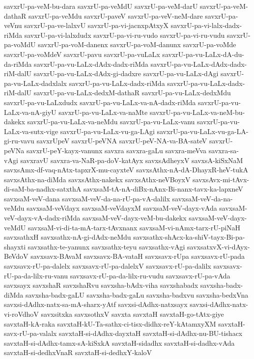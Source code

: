 {savxrU-pa-veM-bu-dara
savxrU-pa-veMdU
savxrU-pa-veM-darU
savxrU-pa-veM-dathaR
savxrU-pa-veMdu
savxrU-paveV
savxrU-pa-veV-neM-dare
savxrU-pa-veVnu
savxrU-pa-ve-lalxvU
savxrU-pa-vi-jacnxpAtxyX
savxrU-pa-vi-lalx-dadx-riMda
savxrU-pa-vi-lalxdudx
savxrU-pa-vi-ru-vudo
savxrU-pa-vi-ru-vudu
savxrU-pa-voMdU
savxrU-pa-voM-danenx
savxrU-pa-voM-danunx
savxrU-pa-voMde
savxrU-pa-voMdeV
savxrU-pavu
savxrU-pa-vuLaLx
savxrU-pa-vu-LaLx-dA-du-da-riMda
savxrU-pa-vu-LaLx-dAdx-dadx-riMda
savxrU-pa-vu-LaLx-dAdx-dadx-riM-dalU
savxrU-pa-vu-LaLx-dAdx-gi-dadxre
savxrU-pa-vu-LaLx-dAgi
savxrU-pa-vu-LaLx-dadxlalx
savxrU-pa-vu-LaLx-dadx-riMda
savxrU-pa-vu-LaLx-dadx-riM-dalU
savxrU-pa-vu-LaLx-dedxM-dathaR
savxrU-pa-vu-LaLx-dedxMdu
savxrU-pa-vu-LaLxdudx
savxrU-pa-vu-LaLx-va-nA-dadx-riMda
savxrU-pa-vu-LaLx-va-nA-giyU
savxrU-pa-vu-LaLx-va-naMte
savxrU-pa-vu-LaLx-va-neM-bu-dakekx
savxrU-pa-vu-LaLx-va-neMdu
savxrU-pa-vu-LaLx-vanu
savxrU-pa-vu-LaLx-va-sutx-vige
savxrU-pa-vu-LaLx-vu-ga-LAgi
savxrU-pa-vu-LaLx-vu-ga-LA-gi-ru-vavu
savxrUpeV
savxrU-peVNA
savxrU-peV-NA-va-BA-sateV
savxrU-peVNa
savxrU-peY-kayx-vanunx
savxra
savxra-gaLu
savxra-meVva
savxra-sa-vAgi
savxravU
savxra-va-NaR-pa-doV-katAyx
savxsAdheyxV
savxsA-kiSxNaM
savxsAmx-df-vaq-nAtx-tapxrX-mu-cayxteV
savxsAthx-nA-dA-DhayxR-heV-tukA
savxsAthx-na-diMda
savxsAthx-nakekx
savxsAthx-neVBoyxV
savxsAvx-mi-tAvx-di-saM-ba-nadhx-satxthA
savxsaM-tA-nA-diBx-nAnx-Bi-nanx-tavx-ka-lapxneV
savxsaM-veV-dana
savxsaM-veV-da-na-rU-pa-vA-dalilx
savxsaM-veV-da-na-veMdu
savxsaM-veVdayx
savxsaM-veVdayxM
savxsaM-veV-dayx-vAda
savxsaM-veV-dayx-vA-dadx-riMda
savxsaM-veV-dayx-veM-bu-dakekx
savxsaM-veV-dayx-veMdU
savxsaM-vi-di-ta-mA-tarx-tAvxnanx
savxsaM-vi-nAmx-tarx-rU-piNaH
savxsathxH
savxsathx-nA-gi-dAdx-neMdu
savxsathx-shAcx-ka-shiV-tayx-Bi-pa-shayxti
savxsathx-te-yanunx
savxsathx-teyu
savxsathx-vAgi
savxsatxvX-vi-dAyx-BeVdoV
savxsavx-BAvaM
savxsavx-BA-vataH
savxsavx-rUpa
savxsavx-rU-pada
savxsavx-rU-pa-dalelx
savxsavx-rU-pa-dalelxV
savxsavx-rU-pa-dalilx
savxsavx-rU-pa-da-lilx-ru-vanu
savxsavx-rU-pa-da-lilx-ru-vudu
savxsavx-rU-pa-vAda
savxsayx
savxshaR
savxshaRvu
savxsha-bAdx-viha
savxshabadx
savxsha-badx-diMda
savxsha-badx-gaLU
savxsha-badx-gaLu
savxsha-badxvu
savxsha-bedxVna
savxsi-dAdhx-natx-sa-mA-sharx-yAtf
savxsi-dAdhx-natxsayx
savxsi-dAdhx-natx-vi-roVdhoV
savxsitxka
savxsothxV
savxta
savxtaH
savxtaH-go-tAtx-giye
savxtaH-kA-raka
savxtaH-kU-Ta-sathx-ci-tisx-didhx-reY-kAtamxyXM
savxtaH-savx-rU-pa-valalx
savxtaH-si-dAdhx-dayxtaH
savxtaH-si-dAdhx-nu-BU-tishacx
savxtaH-si-dAdhx-tamx-sA-kiSxkA
savxtaH-sidadhx
savxtaH-si-dadhx-vAda
savxtaH-si-dedhxVnaR
savxtaH-si-dedhxY-kaloV
}
